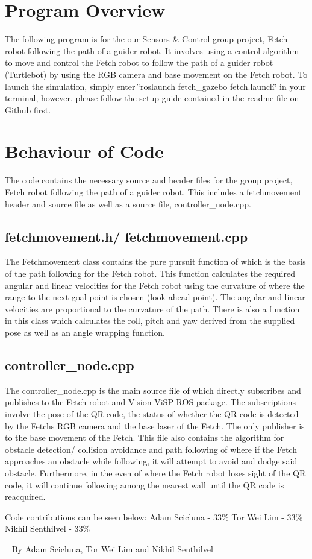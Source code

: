 \hypertarget{index_ac_doc_index_more_info}{}\section{Program Overview}\label{index_ac_doc_index_more_info}
The following program is for the our Sensors \& Control group project, Fetch robot following the path of a guider robot. It involves using a control algorithm to move and control the Fetch robot to follow the path of a guider robot (Turtlebot) by using the R\+GB camera and base movement on the Fetch robot. To launch the simulation, simply enter \char`\"{}roslaunch fetch\+\_\+gazebo fetch.\+launch\char`\"{} in your terminal, however, please follow the setup guide contained in the readme file on Github first.\hypertarget{index_ac_doc_code_behaviour}{}\section{Behaviour of Code}\label{index_ac_doc_code_behaviour}
The code contains the necessary source and header files for the group project, Fetch robot following the path of a guider robot. This includes a \textquotesingle{}fetchmovement\textquotesingle{} header and source file as well as a source file, controller\+\_\+node.\+cpp.\hypertarget{index_ac_doc_data_fetch}{}\subsection{fetchmovement.\+h/ fetchmovement.\+cpp}\label{index_ac_doc_data_fetch}
The Fetchmovement class contains the pure pursuit function of which is the basis of the path following for the Fetch robot. This function calculates the required angular and linear velocities for the Fetch robot using the curvature of where the range to the next goal point is chosen (look-\/ahead point). The angular and linear velocities are proportional to the curvature of the path. There is also a function in this class which calculates the roll, pitch and yaw derived from the supplied pose as well as an angle wrapping function.\hypertarget{index_ac_doc_data_control}{}\subsection{controller\+\_\+node.\+cpp}\label{index_ac_doc_data_control}
The controller\+\_\+node.\+cpp is the main source file of which directly subscribes and publishes to the Fetch robot and Vision Vi\+SP R\+OS package. The subscriptions involve the pose of the QR code, the status of whether the QR code is detected by the Fetch\textquotesingle{}s R\+GB camera and the base laser of the Fetch. The only publisher is to the base movement of the Fetch. This file also contains the algorithm for obstacle detection/ collision avoidance and path following of where if the Fetch approaches an obstacle while following, it will attempt to avoid and dodge said obstacle. Furthermore, in the even of where the Fetch robot loses sight of the QR code, it will continue following among the nearest wall until the QR code is reacquired.

Code contributions can be seen below\+: Adam Scicluna -\/ 33\% Tor Wei Lim -\/ 33\% Nikhil Senthilvel -\/ 33\%

~\newline
 By Adam Scicluna, Tor Wei Lim and Nikhil Senthilvel 